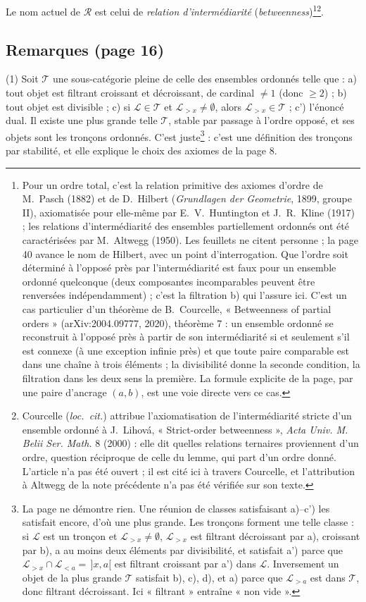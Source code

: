 \documentclass[11pt,a4paper]{article}
\begin{document}
Le nom actuel de $\mathcal{R}$ est celui de \emph{relation d'intermédiarité}
(\emph{betweenness})\footnote{Pour un ordre total, c'est la relation primitive
des axiomes d'ordre de M.~Pasch (1882) et de D.~Hilbert (\emph{Grundlagen der
Geometrie}, 1899, groupe II), axiomatisée pour elle-même par E.~V.~Huntington et
J.~R.~Kline (1917) ; les relations d'intermédiarité des ensembles partiellement
ordonnés ont été caractérisées par M.~Altwegg (1950). Les feuillets ne citent
personne ; la page 40 avance le nom de Hilbert, avec un point d'interrogation.
Que l'ordre soit déterminé à l'opposé près par l'intermédiarité est faux pour un
ensemble ordonné quelconque (deux composantes incomparables peuvent être
renversées indépendamment) ; c'est la filtration b) qui l'assure ici. C'est un
cas particulier d'un théorème de B.~Courcelle, « Betweenness of partial
orders » (arXiv:2004.09777, 2020), théorème 7 : un ensemble ordonné se
reconstruit à l'opposé près à partir de son intermédiarité si et seulement s'il
est connexe (à une exception infinie près) et que toute paire comparable est
dans une chaîne à trois éléments ; la divisibilité donne la seconde condition,
la filtration dans les deux sens la première. La formule explicite de la page,
par une paire d'ancrage $(a, b)$, est une voie directe vers ce cas.}\footnote{Courcelle (\emph{loc.~cit.}) attribue l'axiomatisation de
l'intermédiarité stricte d'un ensemble ordonné à J.~Lihová, « Strict-order
betweenness », \emph{Acta Univ. M. Belii Ser. Math.} 8 (2000) : elle dit quelles
relations ternaires proviennent d'un ordre, question réciproque de celle du
lemme, qui part d'un ordre donné. L'article n'a pas été ouvert ;
il est cité ici à travers Courcelle, et l'attribution à Altwegg de la note
précédente n'a pas été vérifiée sur son texte.}.

\subsection*{Remarques (page 16)}

(1) Soit $\mathcal{T}$ une sous-catégorie pleine de celle des ensembles
ordonnés telle que : a) tout objet est filtrant croissant et décroissant, de
cardinal $\neq 1$ (donc $\geq 2$) ; b) tout objet est divisible ; c) si
$\mathcal{L} \in \mathcal{T}$ et $\mathcal{L}_{>x} \neq \emptyset$, alors
$\mathcal{L}_{>x} \in \mathcal{T}$ ; c') l'énoncé dual. Il existe une plus
grande telle $\mathcal{T}$, stable par passage à l'ordre opposé, et ses objets
sont les tronçons ordonnés. C'est juste\footnote{La page ne démontre rien.
Une réunion de classes satisfaisant a)--c') les satisfait encore, d'où une plus
grande. Les tronçons forment une telle classe : si $\mathcal{L}$ est un tronçon
et $\mathcal{L}_{>x} \neq \emptyset$, $\mathcal{L}_{>x}$ est filtrant
décroissant par a), croissant par b), a au moins deux éléments par
divisibilité, et satisfait a') parce que $\mathcal{L}_{>x} \cap
\mathcal{L}_{<a} = \,]x,a[$ est filtrant croissant par a') dans $\mathcal{L}$.
Inversement un objet de la plus grande $\mathcal{T}$ satisfait b), c), d), et
a) parce que $\mathcal{L}_{>a}$ est dans $\mathcal{T}$, donc filtrant
décroissant. Ici « filtrant » entraîne « non vide ».} : c'est une
définition des tronçons par stabilité, et elle explique le choix des axiomes de
la page 8.
\end{document}
